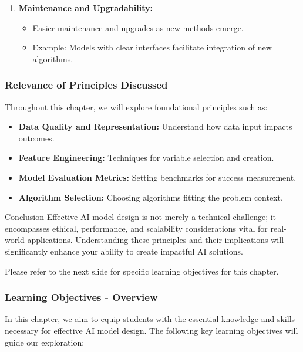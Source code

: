 \documentclass[aspectratio=169]{beamer}
\begin{document}
\begin{frame}[fragile]
\begin{enumerate}
        \item \textbf{Maintenance and Upgradability:}
        \begin{itemize}
            \item Easier maintenance and upgrades as new methods emerge.
            \item Example: Models with clear interfaces facilitate integration of new algorithms.
        \end{itemize}
    \end{enumerate}
\end{frame}

\begin{frame}[fragile]
    \frametitle{Relevance of Principles Discussed}
    Throughout this chapter, we will explore foundational principles such as:
    \begin{itemize}
        \item \textbf{Data Quality and Representation:} Understand how data input impacts outcomes.
        \item \textbf{Feature Engineering:} Techniques for variable selection and creation.
        \item \textbf{Model Evaluation Metrics:} Setting benchmarks for success measurement.
        \item \textbf{Algorithm Selection:} Choosing algorithms fitting the problem context.
    \end{itemize}
    
    \begin{block}{Conclusion}
        Effective AI model design is not merely a technical challenge; it encompasses ethical, performance, and scalability considerations vital for real-world applications. Understanding these principles and their implications will significantly enhance your ability to create impactful AI solutions.
    \end{block}

    Please refer to the next slide for specific learning objectives for this chapter.
\end{frame}

\begin{frame}[fragile]
    \frametitle{Learning Objectives - Overview}
    In this chapter, we aim to equip students with the essential knowledge and skills necessary for effective AI model design. The following key learning objectives will guide our exploration:
\end{frame}
\end{document}

